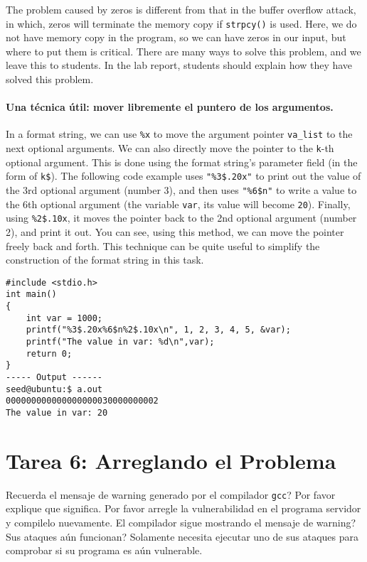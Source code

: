 The problem caused by zeros is different from that
in the buffer overflow attack, in which,
zeros will terminate the memory copy if \texttt{strpcy()} is used. 
Here, we do not have memory copy in the program, 
so we can have zeros in our input, but where to put them
is critical. 
There are many ways to solve this problem, and 
we leave this to students. In the lab report, students
should explain how they have solved this problem. 


\paragraph{Una técnica útil: mover libremente el puntero de los argumentos.}
In a format string, we can use \texttt{\%x} to move the
argument pointer \texttt{va\_list} to the next optional arguments.
We can also directly move the pointer to the \texttt{k}-th optional argument.
This is done using the format string's parameter field (in the form of
\texttt{k\$}).
The following code example uses \texttt{"\%3\$.20x"} to print out the value of the
3rd optional argument (number 3), and then uses \texttt{"\%6\$n"} to write
a value to the 6th optional argument (the variable \texttt{var}, its
value will become \texttt{20}). Finally,
using \texttt{\%2\$.10x}, it moves the pointer back to the 2nd
optional argument (number 2), and print it out. You can see,
using this method, we can move the pointer freely back and forth.
This technique can be quite useful to simplify the construction
of the format string in this task.

\begin{lstlisting}
#include <stdio.h>
int main()
{
    int var = 1000;
    printf("%3$.20x%6$n%2$.10x\n", 1, 2, 3, 4, 5, &var);
    printf("The value in var: %d\n",var);
    return 0;
}
----- Output ------
seed@ubuntu:$ a.out
000000000000000000030000000002
The value in var: 20
\end{lstlisting}




\section{Tarea 6: Arreglando el Problema}

Recuerda el mensaje de warning generado por el compilador \texttt{gcc}? Por favor explique que significa. Por favor arregle la vulnerabilidad en el programa servidor y compilelo nuevamente.
El compilador sigue mostrando el mensaje de warning? Sus ataques aún funcionan? Solamente necesita ejecutar uno de sus ataques para comprobar si su programa es aún vulnerable.


